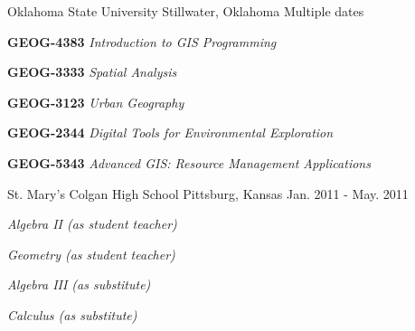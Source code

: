 
  \begin{cventries}
      
    \cventry
      {}
      {Oklahoma State University}
      {Stillwater, Oklahoma}
      {Multiple dates}
      {
        \vspace{-3mm}
        \begin{expitems}
        \item {\textbf{GEOG-4383} \textit{Introduction to GIS Programming}}
        \item {\textbf{GEOG-3333} \textit{Spatial Analysis}}
        \item {\textbf{GEOG-3123} \textit{Urban Geography}}
        \item {\textbf{GEOG-2344} \textit{Digital Tools for Environmental Exploration}}
        \item {\textbf{GEOG-5343} \textit{Advanced GIS: Resource Management Applications}}
        \end{expitems}
      }

    \cventry
      {}
      {St. Mary's Colgan High School}
      {Pittsburg, Kansas}
      {Jan. 2011 - May. 2011}
      {
        \vspace{-3mm}
        \begin{expitems}
        \item {\textit{Algebra II (as student teacher)}}
        \item {\textit{Geometry (as student teacher)}}
        \item {\textit{Algebra III (as substitute)}}
        \item {\textit{Calculus (as substitute)}}
        \end{expitems}
      }

  \end{cventries}